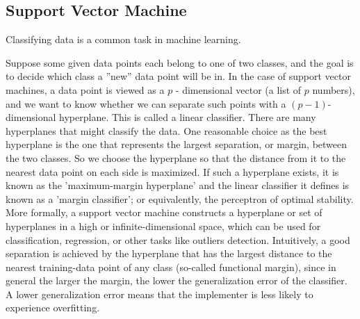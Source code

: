 \subsection{\textbf{Support Vector Machine}}
\cite{SVM}
Classifying data is a common task in machine learning.

Suppose some given data points each belong to one of two classes, and the goal is to decide which class a ''new'' data point will be in. In the case of support vector machines, a data point is viewed as a \(p\) - dimensional vector (a list of \(p\) numbers), and we want to know whether we can separate such points with a \((p-1)\)-dimensional hyperplane. This is called a linear classifier. There are many hyperplanes that might classify the data. One reasonable choice as the best hyperplane is the one that represents the largest separation, or margin, between the two classes. So we choose the hyperplane so that the distance from it to the nearest data point on each side is maximized. If such a hyperplane exists, it is known as the 'maximum-margin hyperplane' and the linear classifier it defines is known as a 'margin classifier'; or equivalently, the perceptron of optimal stability.
\\

More formally, a support vector machine constructs a hyperplane or set of hyperplanes in a high or infinite-dimensional space, which can be used for classification, regression, or other tasks like outliers detection. Intuitively, a good separation is achieved by the hyperplane that has the largest distance to the nearest training-data point of any class (so-called functional margin), since in general the larger the margin, the lower the generalization error of the classifier. A lower generalization error means that the implementer is less likely to experience overfitting.
\\

